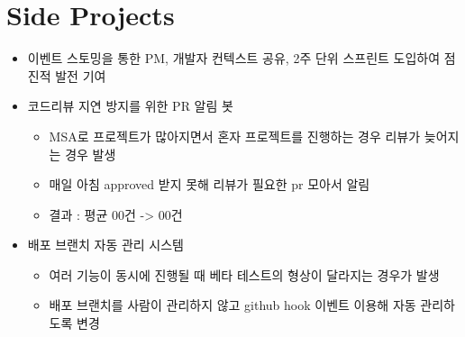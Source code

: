 \documentclass[10pt, letterpaper]{article}
\newenvironment{highlights}{
    \begin{itemize}[
        topsep=0.10 cm,
        parsep=0.10 cm,
        partopsep=0pt,
        itemsep=0pt,
        leftmargin=0.4 cm + 10pt
    ]
    }{
    \end{itemize}
} %
\begin{document}
    \vspace{0.2 cm}


    \section{Side Projects}


    \begin{highlights}

        \item 이벤트 스토밍을 통한 PM, 개발자 컨텍스트 공유, 2주 단위 스프린트 도입하여 점진적 발전 기여
        \item 코드리뷰 지연 방지를 위한 PR 알림 봇
            \begin{highlights}
                \item MSA로 프로젝트가 많아지면서 혼자 프로젝트를 진행하는 경우 리뷰가 늦어지는 경우 발생
                \item 매일 아침 approved 받지 못해 리뷰가 필요한 pr 모아서 알림
                \item 결과 : 평균 00건 -> 00건
            \end{highlights}
        \item 배포 브랜치 자동 관리 시스템
            \begin{highlights}
                \item 여러 기능이 동시에 진행될 때 베타 테스트의 형상이 달라지는 경우가 발생
                \item 배포 브랜치를 사람이 관리하지 않고 github hook 이벤트 이용해 자동 관리하도록 변경
            \end{highlights}

    \end{highlights}
\end{document}
